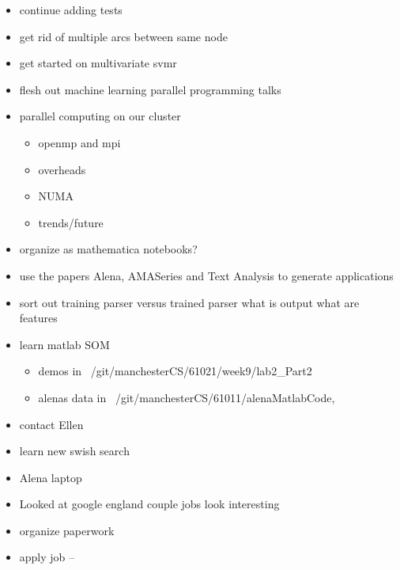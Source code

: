 \documentclass[hyperref]{labbook}
\begin{document}
\begin{itemize}
\item continue adding tests
\item get rid of multiple arcs between same node
\item get started on multivariate svmr
\end{itemize}


\begin{itemize}
\item flesh out machine learning parallel programming talks
\item parallel computing on our cluster
  \begin{itemize}
  \item openmp and mpi
  \item overheads
  \item NUMA
  \item trends/future
  \end{itemize}
\item organize as mathematica notebooks?
\item use the papers Alena, AMASeries and Text Analysis to generate applications
\end{itemize}

\begin{itemize}
\item sort out training parser versus trained parser  what is output  what are features
\item learn matlab SOM
  \begin{itemize}
  \item demos in  ~/git/manchesterCS/61021/week9/lab2\_Part2
  \item alenas data in ~/git/manchesterCS/61011/alenaMatlabCode,
  \end{itemize}

\item contact Ellen
\end{itemize}

\begin{itemize}
\item learn new swish search
\item Alena laptop
\end{itemize}

\begin{itemize}
\item Looked at google england couple jobs look interesting
\item organize paperwork
\item apply job  -- 
\end{itemize}
\end{document}
